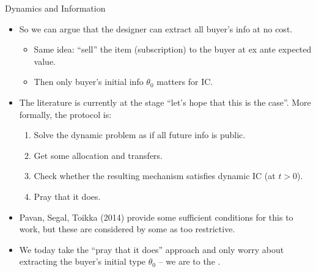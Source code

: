 \documentclass[english,10pt
,aspectratio=169
]{beamer}
\begin{document}
\begin{frame}{Dynamics and Information}
\begin{itemize}
	\item So we can argue that the designer can extract all buyer's  info at no cost.
	\begin{itemize}
		\item Same idea: ``sell'' the item (subscription) to the buyer at ex ante expected value.
		\item Then only buyer's \alert{initial} info $\theta_0$ matters for IC.
	\end{itemize}
	\item The literature is currently at the stage ``let's hope that this is the case''. More formally, the protocol is:
	\begin{enumerate}
		\item Solve the dynamic problem \alert{as if} all future info is \alert{public}.
		\item Get some allocation and transfers.
		\item Check whether the resulting mechanism satisfies dynamic IC (at $t>0$).
		\item Pray that it does.
	\end{enumerate}
	\item Pavan, Segal, Toikka (2014) provide some sufficient conditions for this to work, but these are considered by some as too restrictive.
	\item We today take the ``pray that it does'' approach and only worry about extracting the buyer's initial type $\theta_0$ -- we are  to the .
\end{itemize}
\end{frame}
\end{document}
